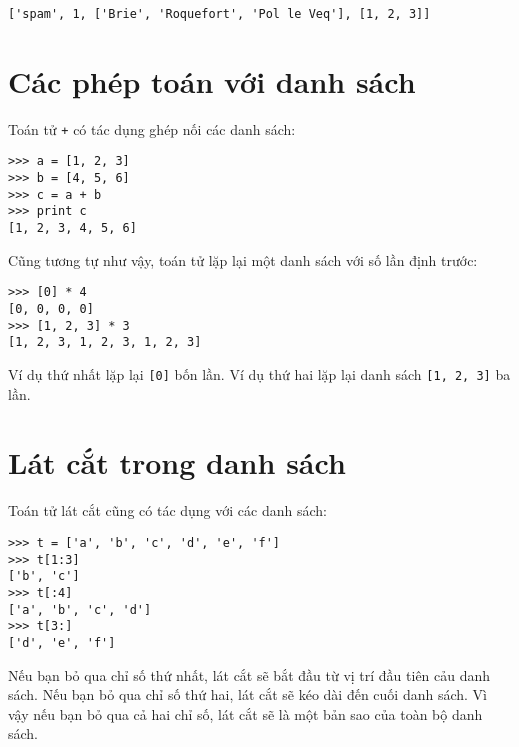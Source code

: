 \documentclass[11pt]{book}
\begin{document}

\beforeverb
\begin{verbatim}
['spam', 1, ['Brie', 'Roquefort', 'Pol le Veq'], [1, 2, 3]]
\end{verbatim}
\afterverb



\section{Các phép toán với danh sách}

Toán tử {\tt +} có tác dụng ghép nối các danh sách:


\beforeverb
\begin{verbatim}
>>> a = [1, 2, 3]
>>> b = [4, 5, 6]
>>> c = a + b
>>> print c
[1, 2, 3, 4, 5, 6]
\end{verbatim}
\afterverb
%
Cũng tương tự như vậy, toán tử {\tt *} lặp lại một danh sách với số lần định trước:


\beforeverb
\begin{verbatim}
>>> [0] * 4
[0, 0, 0, 0]
>>> [1, 2, 3] * 3
[1, 2, 3, 1, 2, 3, 1, 2, 3]
\end{verbatim}
\afterverb
%
Ví dụ thứ nhất lặp lại {\tt [0]} bốn lần. Ví dụ thứ hai lặp lại danh sách {\tt [1, 2, 3]} 
ba lần.


\section{Lát cắt trong danh sách}


Toán tử lát cắt cũng có tác dụng với các danh sách:

\beforeverb
\begin{verbatim}
>>> t = ['a', 'b', 'c', 'd', 'e', 'f']
>>> t[1:3]
['b', 'c']
>>> t[:4]
['a', 'b', 'c', 'd']
>>> t[3:]
['d', 'e', 'f']
\end{verbatim}
\afterverb
%
Nếu bạn bỏ qua chỉ số thứ nhất, lát cắt sẽ bắt đầu từ vị trí 
đầu tiên cảu danh sách. Nếu bạn bỏ qua chỉ số thứ hai, lát cắt
sẽ kéo dài đến cuối danh sách. Vì vậy nếu bạn bỏ qua cả hai
chỉ số, lát cắt sẽ là một bản sao của toàn bộ danh sách.
\end{document}
